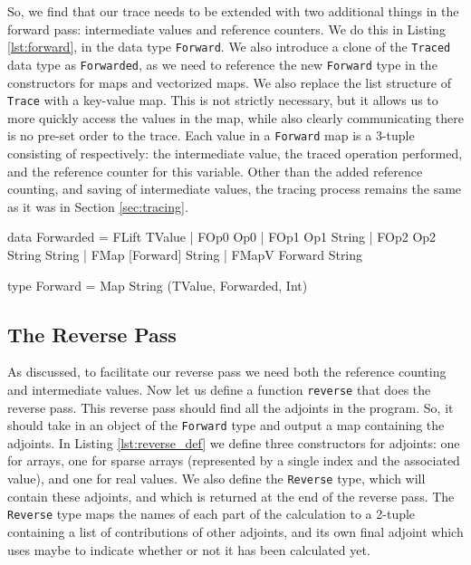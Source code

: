     So, we find that our trace needs to be extended with two additional things in the forward pass: intermediate values and reference counters.
    We do this in Listing \ref{lst:forward}, in the data type \texttt{Forward}.
    We also introduce a clone of the \texttt{Traced} data type as \texttt{Forwarded}, as we need to reference the new \texttt{Forward} type in the constructors for maps and vectorized maps.
    We also replace the list structure of \texttt{Trace} with a key-value map.
    This is not strictly necessary, but it allows us to more quickly access the values in the map, while also clearly communicating there is no pre-set order to the trace.
    Each value in a \texttt{Forward} map is a 3-tuple consisting of respectively: the intermediate value, the traced operation performed, and the reference counter for this variable.
    Other than the added reference counting, and saving of intermediate values, the tracing process remains the same as it was in Section \ref{sec:tracing}.

    \begin{haskell}[caption=Forward pass data structures, label=lst:forward, gobble=8]
        data Forwarded
            = FLift TValue
            | FOp0  Op0
            | FOp1  Op1       String
            | FOp2  Op2       String String
            | FMap  [Forward] String
            | FMapV Forward   String

        type Forward = Map String (TValue, Forwarded, Int)
    \end{haskell}

    \subsection{The Reverse Pass}
        As discussed, to facilitate our reverse pass we need both the reference counting and intermediate values.
        Now let us define a function \texttt{reverse} that does the reverse pass.
        This reverse pass should find all the adjoints in the program.
        So, it should take in an object of the \texttt{Forward} type and output a map containing the adjoints.
        In Listing \ref{lst:reverse_def} we define three constructors for adjoints: one for arrays, one for sparse arrays (represented by a single index and the associated value), and one for real values.
        We also define the \texttt{Reverse} type, which will contain these adjoints, and which is returned at the end of the reverse pass.
        The \texttt{Reverse} type maps the names of each part of the calculation to a 2-tuple containing a list of contributions of other adjoints, and its own final adjoint which uses maybe to indicate whether or not it has been calculated yet.

